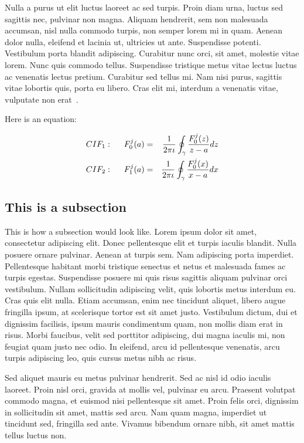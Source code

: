 Nulla a purus ut elit luctus laoreet ac sed turpis. Proin diam urna, luctus sed sagittis nec, pulvinar non magna. Aliquam hendrerit, sem non malesuada accumsan, nisl nulla commodo turpis, non semper lorem mi in quam. Aenean dolor nulla, eleifend et lacinia ut, ultricies ut ante. Suspendisse potenti. Vestibulum porta blandit adipiscing. Curabitur nunc orci, sit amet, molestie vitae lorem. Nunc quis commodo tellus. Suspendisse tristique metus vitae lectus luctus ac venenatis lectus pretium. Curabitur sed tellus mi. Nam nisi purus, sagittis vitae lobortis quis, porta eu libero. Cras elit mi, interdum a venenatis vitae, vulputate non erat~\citet{espinoza2012optimization}.

Here is an equation:

\begin{eqnarray}
CIF_1: \hspace*{5mm}F_0^j(a) &=& \frac{1}{2\pi \iota} \oint_{\gamma} \frac{F_0^j(z)}{z - a} dz\\
CIF_2: \hspace*{5mm}F_1^j(a) &=& \frac{1}{2\pi \iota} \oint_{\gamma} \frac{F_0^j(x)}{x - a} dx \label{eq:cif}
\end{eqnarray}



\subsection{This is a subsection}

This is how a subsection would look like.  Lorem ipsum dolor sit amet, consectetur adipiscing elit. Donec pellentesque elit et turpis iaculis blandit. Nulla posuere ornare pulvinar. Aenean at turpis sem. Nam adipiscing porta imperdiet. Pellentesque habitant morbi tristique senectus et netus et malesuada fames ac turpis egestas. Suspendisse posuere mi quis risus sagittis aliquam pulvinar orci vestibulum. Nullam sollicitudin adipiscing velit, quis lobortis metus interdum eu. Cras quis elit nulla. Etiam accumsan, enim nec tincidunt aliquet, libero augue fringilla ipsum, at scelerisque tortor est sit amet justo. Vestibulum dictum, dui et dignissim facilisis, ipsum mauris condimentum quam, non mollis diam erat in risus. Morbi faucibus, velit sed porttitor adipiscing, dui magna iaculis mi, non feugiat quam justo nec odio. In eleifend, arcu id pellentesque venenatis, arcu turpis adipiscing leo, quis cursus metus nibh ac risus.

Sed aliquet mauris eu metus pulvinar hendrerit. Sed ac nisl id odio iaculis laoreet. Proin nisl orci, gravida at mollis vel, pulvinar eu arcu. Praesent volutpat commodo magna, et euismod nisi pellentesque sit amet. Proin felis orci, dignissim in sollicitudin sit amet, mattis sed arcu. Nam quam magna, imperdiet ut tincidunt sed, fringilla sed ante. Vivamus bibendum ornare nibh, sit amet mattis tellus luctus non.

